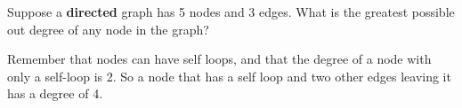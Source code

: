 \Needspace{1in}
\begin{prob}

    Suppose a \textbf{directed} graph has 5 nodes and 3 edges. What is the
    greatest possible out degree of any node in the graph?


    \begin{soln}
        Remember that nodes can have self loops, and that the degree of a node
        with only a self-loop is 2. So a node that has a self loop and two
        other edges leaving it has a degree of 4.
    \end{soln}


\end{prob}
